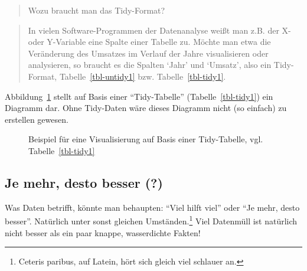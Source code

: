 \documentclass[
  letterpaper,
]{scrbook}
\theoremstyle{definition}
\theoremstyle{definition}
\theoremstyle{definition}
\theoremstyle{remark}
\begin{document}
\begin{quote}
{} Wozu braucht man das Tidy-Format?
\end{quote}

\begin{quote}
{} In vielen Software-Programmen der Datenanalyse
weißt man z.B. der X- oder Y-Variable eine Spalte einer Tabelle zu.
Möchte man etwa die Veränderung des Umsatzes im Verlauf der Jahre
visualisieren oder analysieren, so braucht es die Spalten `Jahr' und
`Umsatz', also ein Tidy-Format, Tabelle~\ref{tbl-untidy1} bzw.
Tabelle~\ref{tbl-tidy1}.
\end{quote}

Abbildung~\ref{fig-tidy} stellt auf Basis einer ``Tidy-Tabelle''
(Tabelle~\ref{tbl-tidy1}) ein Diagramm dar. Ohne Tidy-Daten wäre dieses
Diagramm nicht (so einfach) zu erstellen gewesen.

\begin{figure}


\caption{\label{fig-tidy}Beispiel für eine Visualisierung auf Basis
einer Tidy-Tabelle, vgl. Tabelle~\ref{tbl-tidy1}}

\end{figure}%

\subsection{Je mehr, desto besser (?)}\label{je-mehr-desto-besser}

Was Daten betrifft, könnte man behaupten: ``Viel hilft viel'' oder ``Je
mehr, desto besser''. Natürlich unter sonst gleichen
Umständen.\footnote{Ceteris paribus, auf Latein, hört sich gleich viel
  schlauer an.} Viel Datenmüll ist natürlich nicht besser als ein paar
knappe, wasserdichte Fakten!
\end{document}
